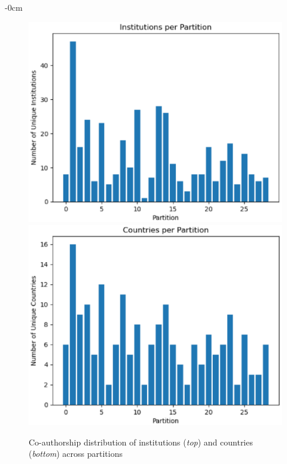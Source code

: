 \documentclass[jmse,review,submit,pdftex,moreauthors]{Definitions/mdpi}
\begin{document}
\begin{adjustwidth}{-\extralength}{0cm}
\begin{figure}[H]
	\centering
	\includegraphics[height=0.2\textheight, keepaspectratio]{pics/coauthorship_inst_per_partition.eps}
	\includegraphics[height=0.2\textheight, keepaspectratio]{pics/coauthorship_country_per_partition.eps}
	\caption{Co-authorship distribution of institutions (\textit{top}) and countries (\textit{bottom}) across partitions}\label{fig:fig5}
\end{figure}


\end{adjustwidth}
\end{document}
